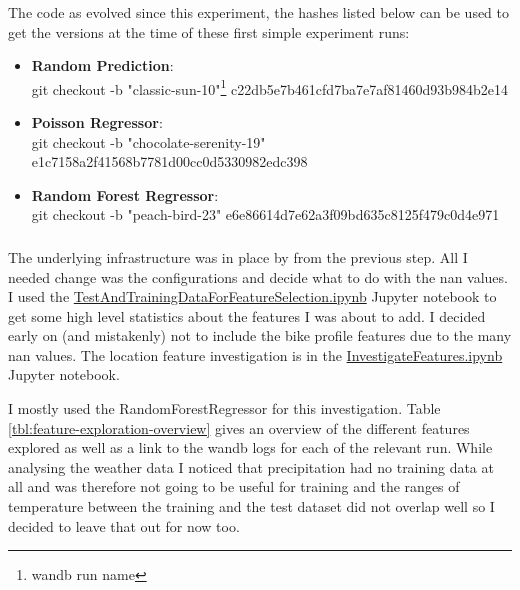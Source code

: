 \documentclass[a4paper]{article}
\begin{document}
    The code as evolved since this experiment, the hashes listed below can be used to get the versions at the time of
    these first simple experiment runs:

    \begin{itemize}
        \item \textbf{Random Prediction}: \\git checkout -b "classic-sun-10"\footnote{\label{fn:wand-db-name}wandb run name} c22db5e7b461cfd7ba7e7af81460d93b984b2e14
        \item \textbf{Poisson Regressor}: \\git checkout -b "chocolate-serenity-19" e1c7158a2f41568b7781d00cc0d5330982edc398
        \item \textbf{Random Forest Regressor}: \\git checkout -b "peach-bird-23" e6e86614d7e62a3f09bd635c8125f479c0d4e971
    \end{itemize}

    \subsubsection*{}
    The underlying infrastructure was in place by from the previous step. All I needed change was the configurations
    and decide what to do with the nan values. I used the
    \href{https://github.com/isabelladegen/mlp-2021/blob/c48d85dc364b5a2e7e59f16961b32f9e6c245735/notebooks/TestAndTrainingDataForFeatureSelection.ipynb}{TestAndTrainingDataForFeatureSelection.ipynb}
    Jupyter notebook to get some high level statistics about the features I was about to add. I decided early
    on (and mistakenly) not to include the bike profile features due to the many nan values. The location feature investigation is
    in the \href{https://github.com/isabelladegen/mlp-2021/blob/c48d85dc364b5a2e7e59f16961b32f9e6c245735/notebooks/InvestigateFeatures.ipynb}{InvestigateFeatures.ipynb}
    Jupyter notebook.

    I mostly used the RandomForestRegressor for this investigation. Table \ref{tbl:feature-exploration-overview} gives an
    overview of the different
    features explored as well as a link to the wandb logs for each of the relevant run. While analysing the
    weather data I noticed that precipitation had no training data at all and was therefore not going to be useful for training and
    the ranges of temperature between the training and the test dataset did not overlap well so I decided to leave that out
    for now too.
\end{document}
